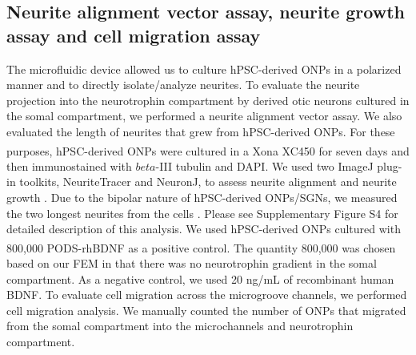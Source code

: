 \documentclass[review]{elsarticle}
\begin{document}
\subsection{Neurite alignment vector assay, neurite growth assay and cell migration assay}
The microfluidic device allowed us to culture hPSC-derived ONPs in a polarized manner and to directly isolate/analyze neurites. To evaluate the neurite projection into the neurotrophin compartment by derived otic neurons cultured in the somal compartment, we performed a neurite alignment vector assay. We also evaluated the length of neurites that grew from hPSC-derived ONPs. For these purposes, hPSC-derived ONPs were cultured in a Xona\textsuperscript{\texttrademark} XC450 for seven days and then immunostained with $beta$-III tubulin and DAPI. We used two ImageJ plug-in toolkits, NeuriteTracer and NeuronJ, to assess neurite alignment and neurite growth \cite{Pool2008, Meijering2004}. Due to the bipolar nature of hPSC-derived ONPs/SGNs, we measured the two longest neurites from the cells \cite{Matsuoka2017,Anniko1995}. Please see Supplementary Figure S4 for detailed description of this analysis. We used hPSC-derived ONPs cultured with 800,000 PODS\textsuperscript{\textregistered}-rhBDNF as a positive control. The quantity 800,000 was chosen based on our FEM in that there was no neurotrophin gradient in the somal compartment. As a negative control, we used 20 ng/mL of recombinant human BDNF. To evaluate cell migration across the microgroove channels, we performed cell migration analysis. We manually counted the number of ONPs that migrated from the somal compartment into the microchannels and neurotrophin compartment. 
\end{document}
